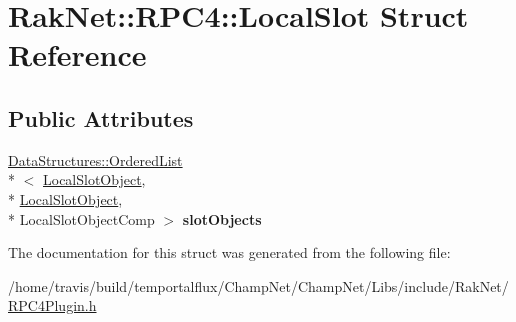 \hypertarget{struct_rak_net_1_1_r_p_c4_1_1_local_slot}{\section{Rak\-Net\-:\-:R\-P\-C4\-:\-:Local\-Slot Struct Reference}
\label{struct_rak_net_1_1_r_p_c4_1_1_local_slot}
}
\subsection*{Public Attributes}
\begin{DoxyCompactItemize}
\item 
\hypertarget{struct_rak_net_1_1_r_p_c4_1_1_local_slot_a8dbc37079eab7a42ddf481f84bfbadd9}{\hyperlink{class_data_structures_1_1_ordered_list}{Data\-Structures\-::\-Ordered\-List}\\*
$<$ \hyperlink{struct_rak_net_1_1_r_p_c4_1_1_local_slot_object}{Local\-Slot\-Object}, \\*
\hyperlink{struct_rak_net_1_1_r_p_c4_1_1_local_slot_object}{Local\-Slot\-Object}, \\*
Local\-Slot\-Object\-Comp $>$ {\bfseries slot\-Objects}}\label{struct_rak_net_1_1_r_p_c4_1_1_local_slot_a8dbc37079eab7a42ddf481f84bfbadd9}

\end{DoxyCompactItemize}


The documentation for this struct was generated from the following file\-:\begin{DoxyCompactItemize}
\item 
/home/travis/build/temportalflux/\-Champ\-Net/\-Champ\-Net/\-Libs/include/\-Rak\-Net/\hyperlink{_r_p_c4_plugin_8h}{R\-P\-C4\-Plugin.\-h}\end{DoxyCompactItemize}
